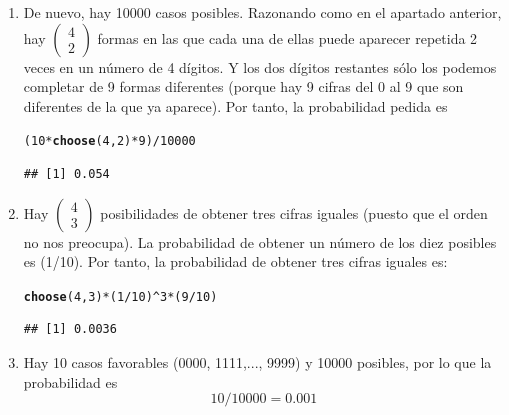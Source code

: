 \documentclass[10pt,a4paper]{article}\usepackage[]{graphicx}\usepackage[]{color}
\makeatletter
\newcommand{\hlnum}[1]{\textcolor[rgb]{0.686,0.059,0.569}{#1}}%
\newcommand{\hlopt}[1]{\textcolor[rgb]{0,0,0}{#1}}%
\newcommand{\hlstd}[1]{\textcolor[rgb]{0.345,0.345,0.345}{#1}}%
\newcommand{\hlkwd}[1]{\textcolor[rgb]{0.737,0.353,0.396}{\textbf{#1}}}%
\newenvironment{kframe}{%
 \def\at@end@of@kframe{}%
 \ifinner\ifhmode%
  \def\at@end@of@kframe{\end{minipage}}%
  \begin{minipage}{\columnwidth}%
 \fi\fi%
 \def\FrameCommand##1{\hskip\@totalleftmargin \hskip-\fboxsep
 \colorbox{shadecolor}{##1}\hskip-\fboxsep
     \hskip-\linewidth \hskip-\@totalleftmargin \hskip\columnwidth}%
 \MakeFramed {\advance\hsize-\width
   \@totalleftmargin\z@ \linewidth\hsize
   \@setminipage}}%
 {\par\unskip\endMakeFramed%
 \at@end@of@kframe}
\newenvironment{knitrout}{}{} %
\makeatother
\begin{document}
\begin{enumerate}
\item De nuevo, hay 10000 casos posibles. 
Razonando como en el apartado anterior, hay 
 $\left(\begin{array}{c} 4 \\ 2 \end{array} \right)$ formas en las que cada una de ellas puede aparecer repetida 2 veces en un número de 4 dígitos. Y los dos dígitos restantes sólo los podemos completar de 9 formas diferentes (porque hay 9 cifras del 0 al 9 que son diferentes de la que ya aparece). Por tanto, la probabilidad pedida es 
\begin{knitrout}
\color{fgcolor}\begin{kframe}
\begin{alltt}
\hlstd{(}\hlnum{10}\hlopt{*}\hlkwd{choose}\hlstd{(}\hlnum{4}\hlstd{,}\hlnum{2}\hlstd{)}\hlopt{*}\hlnum{9}\hlstd{)}\hlopt{/}\hlnum{10000}
\end{alltt}
\begin{verbatim}
## [1] 0.054
\end{verbatim}
\end{kframe}
\end{knitrout}


\item Hay $\left(\begin{array}{c} 4 \\ 3 \end{array} \right)$ posibilidades de obtener tres cifras iguales (puesto que el orden no nos
preocupa). La probabilidad de obtener un n\'umero de los diez posibles es (1/10). Por tanto, la probabilidad de obtener tres cifras
iguales es: 
\begin{knitrout}
\color{fgcolor}\begin{kframe}
\begin{alltt}
\hlkwd{choose}\hlstd{(}\hlnum{4}\hlstd{,}\hlnum{3}\hlstd{)}\hlopt{*}\hlstd{(}\hlnum{1}\hlopt{/}\hlnum{10}\hlstd{)}\hlopt{^}\hlnum{3}\hlopt{*}\hlstd{(}\hlnum{9}\hlopt{/}\hlnum{10}\hlstd{)}
\end{alltt}
\begin{verbatim}
## [1] 0.0036
\end{verbatim}
\end{kframe}
\end{knitrout}

\item Hay 10 casos favorables (0000, 1111,..., 9999) y 10000 posibles, por lo que la probabilidad es 
$$10/10000=0.001$$
\end{enumerate}
\end{document}

